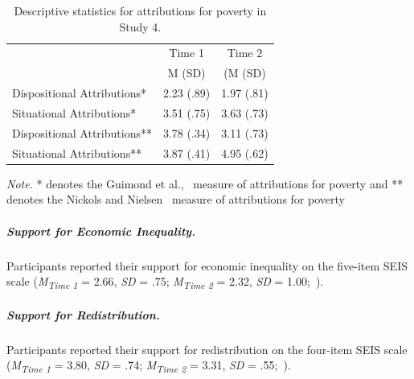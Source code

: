 \documentclass{sfuthesis}
\begin{document}
\begin{table}[h]
  \begin{center}
    \caption{Descriptive statistics for attributions for poverty in Study 4.}
    \label{tab:tenthtable}
    \begin{tabular}{l c c}
    \hline
      & \multicolumn{1}{c}{Time 1} & \multicolumn{1}{c}{Time 2}\\\cmidrule{2-3}
      & \multicolumn{1}{c}{M (SD)} & \multicolumn{1}{c}{(M (SD)}\\
      \hline
      Dispositional Attributions* & \multicolumn{1}{c}{2.23 (.89)} & \multicolumn{1}{c}{1.97 (.81)}\\
      Situational Attributions* & \multicolumn{1}{c}{3.51 (.75)} & \multicolumn{1}{c}{3.63 (.73)}\\
      Dispositional Attributions** & \multicolumn{1}{c}{3.78 (.34)} & \multicolumn{1}{c}{3.11 (.73)}\\
      Situational Attributions** & \multicolumn{1}{c}{3.87 (.41)} & \multicolumn{1}{c}{4.95 (.62)}\\
      \hline
    \end{tabular}
  \end{center}
  \textit{Note.} * denotes the Guimond et al.,~\cite{guimond89} measure of attributions for poverty and ** denotes the Nickols and Nielsen~\cite{nickols11} measure of attributions for poverty
\end{table}

\subparagraph{Support for Economic Inequality.} Participants reported their support for economic inequality on the five-item SEIS scale (\textit{M\textsubscript{Time 1}} = 2.66, \textit{SD} = .75; \textit{M\textsubscript{Time 2}} = 2.32, \textit{SD} = 1.00;~\cite{wiwadunpub}).

\subparagraph{Support for Redistribution.} Participants reported their support for redistribution on the four-item SEIS scale (\textit{M\textsubscript{Time 1}} = 3.80, \textit{SD} = .74; \textit{M\textsubscript{Time 2}} = 3.31, \textit{SD} = .55;~\cite{inglehart}).
\end{document}
